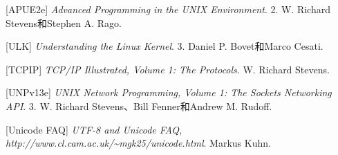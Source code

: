 \begin{BookBibliographyEntry}

[APUE2e] \emph{Advanced Programming in the UNIX Environment}. 2.\BookSplit{} W.\BookSplit{}  Richard Stevens和Stephen A.\BookSplit{} Rago.

\end{BookBibliographyEntry}

\begin{BookBibliographyEntry}

[ULK] \emph{Understanding the Linux Kernel}. 3.\BookSplit{} Daniel P.\BookSplit{} Bovet和Marco Cesati.

\end{BookBibliographyEntry}

\begin{BookBibliographyEntry}

[TCPIP] \emph{TCP/\BookSplit{}IP Illustrated, Volume 1:\BookSplit{} The Protocols}. W.\BookSplit{}  Richard Stevens.

\end{BookBibliographyEntry}

\begin{BookBibliographyEntry}

[UNPv13e] \emph{UNIX Network Programming, Volume 1:\BookSplit{} The Sockets Networking API}. 3.\BookSplit{} W.\BookSplit{}  Richard Stevens、Bill Fenner和Andrew M.\BookSplit{} Rudoff.

\end{BookBibliographyEntry}

\begin{BookBibliographyEntry}

[Unicode FAQ] \emph{UTF-8 and Unicode FAQ, http:\BookSplit{}/\BookSplit{}/\BookSplit{}www.\BookSplit{}cl.\BookSplit{}cam.\BookSplit{}ac.\BookSplit{}uk/\BookSplit{}\textasciitilde{}\BookSplit{}mgk25/\BookSplit{}unicode.\BookSplit{}html}. Markus Kuhn.

\end{BookBibliographyEntry}

